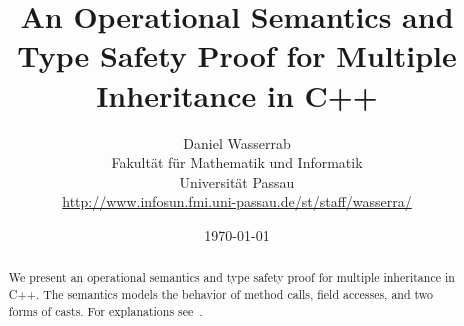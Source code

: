 \documentclass[11pt,a4paper]{article}
\begin{document}
\title{An Operational Semantics and Type Safety Proof for 
Multiple Inheritance in C++}

\author{Daniel Wasserrab\\
Fakult\"at f\"ur Mathematik und Informatik\\
Universit\"at Passau\\
\url{http://www.infosun.fmi.uni-passau.de/st/staff/wasserra/}}

\date{\today}
      
\maketitle

\begin{abstract}
We present an operational semantics and type safety proof for multiple
inheritance in C++. The semantics models the behavior of method calls, field
accesses, and two forms of casts.
For explanations see~\cite{WasserrabNST-OOPSLA06}.
\end{abstract}

\tableofcontents



\clearpage
{}
{}


\end{document}
